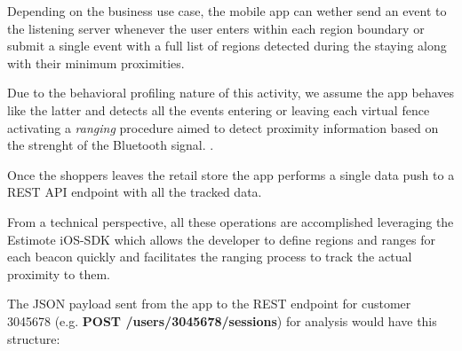 Depending on the business use case, the mobile app can wether send an event to the listening server whenever the user enters within each region boundary or submit a single event with a full list of regions detected during the staying along with their minimum proximities. 

Due to the behavioral profiling nature of this activity, we assume the app behaves like the latter and detects all the events entering or leaving each virtual fence activating a \textit{ranging} procedure aimed to detect proximity information based on the strenght of the Bluetooth signal. \cite{region-monitoring-apple}.

Once the shoppers leaves the retail store the app performs a single data push to a REST API endpoint with all the tracked data.

From a technical perspective, all these operations are accomplished leveraging the Estimote iOS-SDK \cite{estimote-ios-sdk} which allows the developer to define regions and ranges for each beacon quickly and facilitates the ranging process to track the actual proximity to them.

The JSON payload sent from the app to the REST endpoint for customer 3045678 (e.g. \textbf{POST /users/3045678/sessions}) for analysis would have this structure:


